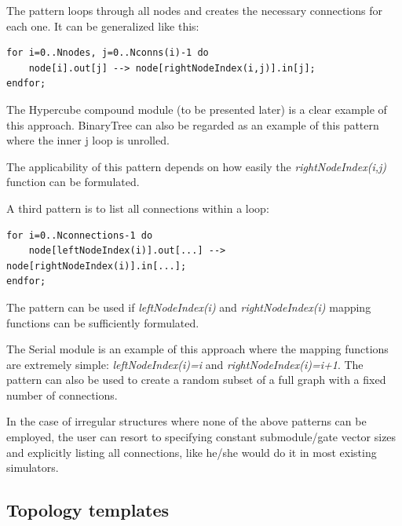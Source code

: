 

The pattern loops through all nodes and creates the necessary
connections for each one. It can be generalized like this:


\begin{Verbatim}[commandchars=\\\{\}]
for i=0..Nnodes, j=0..Nconns(i)-1 do
    node[i].out[j] --> node[rightNodeIndex(i,j)].in[j];
endfor;
\end{Verbatim}



The Hypercube compound module (to be
presented later) is a clear example of this approach. BinaryTree can
also be regarded as an example of this pattern where the inner j loop
is unrolled.

The applicability of this pattern depends on how easily the \textit{rightNodeIndex(i,j)}
function can be formulated.




A third pattern is to list all connections within a loop:


\begin{Verbatim}[commandchars=\\\{\}]
for i=0..Nconnections-1 do
    node[leftNodeIndex(i)].out[...] --> node[rightNodeIndex(i)].in[...];
endfor;
\end{Verbatim}



The pattern can be used if \textit{leftNodeIndex(i)} and \textit{rightNodeIndex(i)}
mapping functions can be sufficiently formulated.

The Serial module is an example of this approach where the mapping
functions are extremely simple: \textit{leftNodeIndex(i)=i} and \textit{rightNodeIndex(i)=i+1}.
The pattern can also be used to create a random subset of a full
graph with a fixed number of connections.

In the case of irregular structures where none of the above patterns
can be employed, the user can resort to specifying constant submodule/gate
vector sizes and explicitly listing all connections, like he/she
would do it in most existing simulators.





\subsection{Topology templates}
\label{sec:ch-ned-lang:topology-templates}



